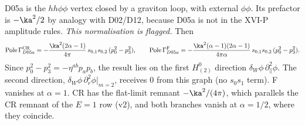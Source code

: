 \begin{theorem}\label{thm:D05a}
D05a is the $hh\phi\phi$ vertex closed by a graviton loop, with external $\phi\phi$. Its prefactor is $-\ka^2/2$ by analogy with D02/D12, because D05a is not in the XVI-P amplitude rules. \emph{This normalisation is flagged.} Then
\[ \mathrm{Pole}\,\Gamma_{D05a}^{\rm CR}=-\frac{\ka^2(2\alpha-1)}{4\pi}\,s_{0,1}s_{0,2}\,(p_0^2-p_3^2),\qquad
\mathrm{Pole}\,\Gamma_{D05a}^{\rm F}=-\frac{\ka^2(\alpha-1)(2\alpha-1)}{4\pi\alpha}\,s_{0,1}s_{0,2}\,(p_0^2-p_3^2). \]
Since $p_0^2-p_3^2=-\eta^{ab}p_ap_b$, the result lies on the first $H^0_{(2)}$ direction $\delta_W\phi\,\partial_\parallel^2\phi$. The second direction, $\delta_W\phi\,\partial_r^2\phi|_{m=2}$, receives $0$ from this graph (no $s_0s_1$ term). F vanishes at $\alpha=1$. CR has the flat-limit remnant $-\ka^2/(4\pi)$, which parallels the CR remnant of the $E=1$ row (v2), and both branches vanish at $\alpha=1/2$, where they coincide.
\end{theorem}
